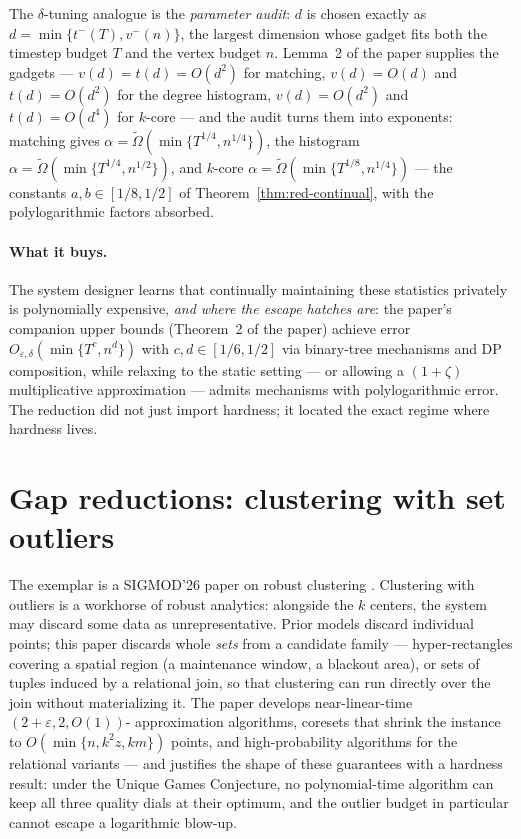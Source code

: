 The $\delta$-tuning analogue is the \emph{parameter audit}: $d$ is chosen exactly as
$d = \min\{t^{-}(T), v^{-}(n)\}$, the largest dimension whose gadget fits both the
timestep budget $T$ and the vertex budget $n$. Lemma~2 of the paper supplies the
gadgets --- $v(d) = t(d) = O(d^2)$ for matching, $v(d) = O(d)$ and $t(d) = O(d^2)$ for
the degree histogram, $v(d) = O(d^2)$ and $t(d) = O(d^4)$ for $k$-core --- and the audit
turns them into exponents: matching gives $\alpha =
\widetilde{\Omega}(\min\{T^{1/4}, n^{1/4}\})$, the histogram $\alpha =
\widetilde{\Omega}(\min\{T^{1/4}, n^{1/2}\})$, and $k$-core $\alpha =
\widetilde{\Omega}(\min\{T^{1/8}, n^{1/4}\})$ --- the constants $a, b \in [1/8, 1/2]$
of Theorem~\ref{thm:red-continual}, with the polylogarithmic factors absorbed.

\paragraph{What it buys.}
The system designer learns that continually maintaining these statistics privately is
polynomially expensive, \emph{and where the escape hatches are}: the paper's companion
upper bounds (Theorem~2 of the paper) achieve error $O_{\varepsilon,\delta}(
\min\{T^{c}, n^{d}\})$ with $c, d \in [1/6, 1/2]$ via binary-tree mechanisms and DP
composition, while relaxing to the static setting --- or allowing a $(1+\zeta)$
multiplicative approximation --- admits mechanisms with polylogarithmic error. The
reduction did not just import hardness; it located the exact regime where hardness
lives.

\section{Gap reductions: clustering with set outliers}
\label{sec:red-outliers}

The exemplar is a SIGMOD'26 paper on robust clustering \citep{sigmod26-289}. Clustering
with outliers is a workhorse of robust analytics: alongside the $k$ centers, the system
may discard some data as unrepresentative. Prior models discard individual points; this
paper discards whole \emph{sets} from a candidate family --- hyper-rectangles covering
a spatial region (a maintenance window, a blackout area), or sets of tuples induced by
a relational join, so that clustering can run directly over the join without
materializing it. The paper develops near-linear-time $(2+\varepsilon, 2, O(1))$-
approximation algorithms, coresets that shrink the instance to
$O(\min\{n, k^2 z, km\})$ points, and high-probability algorithms for the relational
variants --- and justifies the shape of these guarantees with a hardness result: under
the Unique Games Conjecture, no polynomial-time algorithm can keep all three quality
dials at their optimum, and the outlier budget in particular cannot escape a
logarithmic blow-up.

